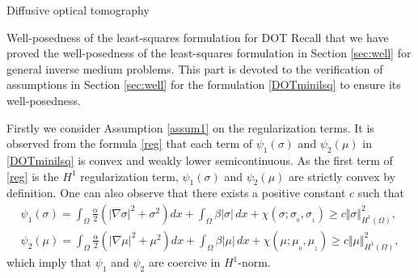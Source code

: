 \documentclass[11pt]{article}%
\renewcommand{\_}{{\fontfamily{ptm}\selectfont\textunderscore}}
\theoremstyle{plain}
\numberwithin{equation}{section}
\begin{document}
\begin{section}{Diffusive optical tomography}
\begin{subsection}{Well-posedness of the least-squares formulation for DOT}
Recall that we have proved the well-posedness of the least-squares formulation 
in Section \ref{sec:well} for general inverse medium problems. This part is devoted to the verification of assumptions in Section \ref{sec:well} for the formulation \eqref{DOTminilsq} to ensure its well-posedness. 

Firstly we consider Assumption \ref{assum1} on the regularization terms. 
It is observed from the formula \eqref{reg} that each term of $\psi_1(\sigma)$ and $\psi_2(\mu)$ in \eqref{DOTminilsq} is convex and weakly lower semicontinuous. 
As the first term of \eqref{reg} is the $H^1$ regularization term, $\psi_1(\sigma)$ and $\psi_2(\mu)$ are strictly convex by definition.
One can also observe that there exists a positive constant $c$ such that
\begin{equation}\label{DOTcoer}
\begin{aligned}
\psi_1(\sigma) = \int_\Omega \frac{\alpha}{2}(|\nabla \sigma|^2+\sigma^2)dx+
\int_\Omega\beta|\sigma|\,dx+\chi(\sigma; \sigma_{_0}, \sigma_{_1})\geq c \Vert\sigma\Vert^2_{H^1(\Omega)},\\
\psi_2(\mu) = \int_\Omega \frac{\alpha}{2}(|\nabla \mu|^2+\mu^2)dx+
\int_\Omega\beta|\mu|\,dx+\chi(\mu; \mu_{_0}, \mu_{_1})\geq c \Vert\mu\Vert^2_{H^1(\Omega)},
\end{aligned}
\end{equation}
which imply that $\psi_1$ and $\psi_2$ are coercive in $H^1$-norm. 



\end{subsection}
\end{section}
\end{document}
